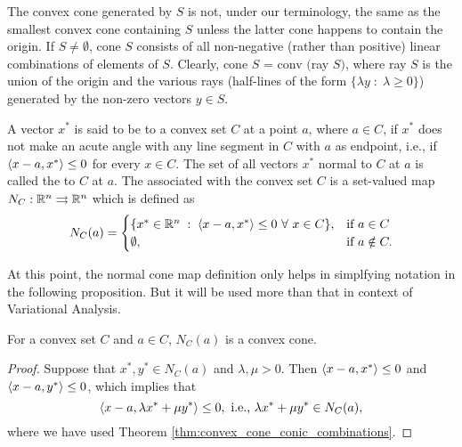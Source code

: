 \documentclass[11pt,a4paper]{article}
\begin{document}
\begin{remark}\label{remark:convex_cone_generated_by_a_set}
    The convex cone generated by $S$ is not, under our terminology, the same as the smallest convex cone containing $S$ unless the latter cone happens to contain the origin. If $S\neq\emptyset$, cone $S$ consists of all non-negative (rather than positive) linear combinations of elements of $S$. Clearly, cone $S$ = conv $($ray $S)$, where ray $S$ is the union of the origin and the various rays (half-lines of the form $\{\lambda y \;:\; \lambda\ge 0\}$) generated by the non-zero vectors $y\in S$.
\end{remark}

\begin{definition}
    A vector $x^*$ is said to be  to a convex set $C$ at a point $a$, where $a\in C$, if $x^*$ does not make an acute angle with any line segment in $C$ with $a$ as endpoint, i.e., if $\langle x-a, x^* \rangle\le 0$ for every $x\in C$. The set of all vectors $x^*$ normal to $C$ at $a$ is called the  to $C$ at $a$. The  associated with the convex set $C$ is a set-valued map $N_C:\mathbb{R}^n\rightrightarrows \mathbb{R}^n$ which is defined as
    \begin{equation*}
        N_C(a) = 
        \begin{cases}
			\{x^*\in\R^n\;:\; \innerproduct{x-a}{x^*}\le 0\ \forall\ x\in C\}, & \text{if }a\in C\\
            \emptyset, & \text{if } a\notin C.
		 \end{cases}
    \end{equation*}
\end{definition}

At this point, the normal cone map definition only helps in simplfying notation in the following proposition. But it will be used more than that in context of Variational Analysis.

\begin{proposition}
    For a convex set $C$ and $a\in C$, $N_C(a)$ is a convex cone.
\end{proposition}

\begin{proof}
    Suppose that $x^*,y^*\in N_C(a)$ and $\lambda,\mu >0$. Then $\langle x-a, x^* \rangle\le 0$ and $\langle x-a, y^* \rangle\le 0$, which implies that
    \begin{equation*}
        \langle x-a, \lambda x^*+\mu y^* \rangle \le 0,\ \text{i.e.,}\ \lambda x^* +\mu y^* \in N_C(a), 
    \end{equation*}
    where we have used Theorem \ref{thm:convex_cone_conic_combinations}.
\end{proof}
\end{document}
